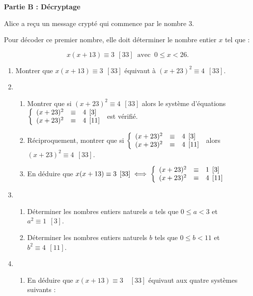\documentclass[10pt]{article}
\begin{document}
\bigskip

\textbf{Partie B : Décryptage}

\medskip

Alice a reçu un message crypté qui commence par le nombre 3.

Pour décoder ce premier nombre, elle doit déterminer le nombre entier $x$ tel que :

\[x(x + 13) \equiv  3 \:\: [33]\:  \text{ avec }\: 0 \leqslant  x < 26.\]

\medskip

\begin{enumerate}
\item Montrer que $x(x + 13) \equiv 3\:\: [33]$ équivaut à $(x + 23)^2 \equiv 4\:\: [33]$.
\item
	\begin{enumerate}
		\item Montrer que si $(x + 23)^2 \equiv 4\:\: [33]$ alors le système d'équations $\left\{\begin{array}{l c l}
(x + 23)^2 &\equiv &4 \:\: [3]\\ 
(x + 23)^2 &\equiv &4 \:\: [11]
\end{array}\right.$ est vérifié.
		\item Réciproquement, montrer que si  $\left\{\begin{array}{l c l}
(x + 23)^2 &\equiv &4\:\: [3]\\ 
(x + 23)^2 &\equiv &4 \:\: [11]
\end{array}\right.$ alors $(x + 23)^2 \equiv 4\:\: [33]$.
		\item En déduire que $x(x + 13) \equiv 3\:\: [33] \iff  \left\{\begin{array}{l c l}
(x + 23)^2 &\equiv&1 \:\: [3]\\
(x + 23)^2 &\equiv& 4 \:\: [11]
\end{array}\right.$
	\end{enumerate}
\item
	\begin{enumerate}
		\item Déterminer les nombres entiers naturels $a$ tels que $0 \leqslant a < 3$ et $a^2 \equiv 1 \:\:  [3]$.
		\item Déterminer les nombres entiers naturels $b$ tels que $0 \leqslant b < 11$ et $b^2 \equiv 4\:\: [11]$.
 	\end{enumerate}
\item
	\begin{enumerate}
		\item En déduire que $x(x + 13) \equiv 3 \quad[33]$ équivaut aux quatre systèmes suivants :
		

\end{enumerate}
\end{enumerate}
\end{document}
